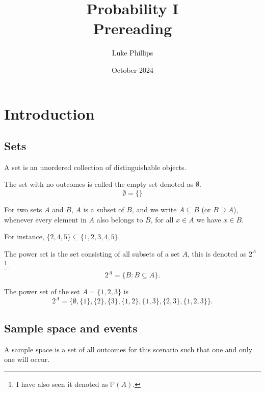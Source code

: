 \documentclass[10pt, a4paper]{article}
\title{Probability I \\
    \large Prereading}
\author{Luke Phillips}
\date{October 2024}
\begin{document}
\maketitle

\newpage

\section{Introduction}

\subsection{Sets}

A set is an unordered collection of distinguishable objects. 

\begin{definition}
    The set with no outcomes is called the empty set denoted as $\emptyset$.
    \[
    \emptyset = \{\}
    \]
\end{definition}

\begin{definition}[Subset]
    For two sets $A$ and $B$, $A$ is a subset of $B$, and we write $A \subseteq B$ (or $B \supseteq A$), whenever every element in $A$ also belongs to $B$, for all $x \in A$ we have $x \in B$.
\end{definition}

\begin{example}
    For instance, $\{2, 4, 5\} \subseteq \{1, 2, 3, 4, 5\}$.    
\end{example}

\begin{definition}
    The power set is the set consisting of all subsets of a set $A$, this is denoted as $2 ^ A$\footnote{I have also seen it denoted as $\mathbb{P}(A)$.}.
    \[
    2 ^ A = \{B: B \subseteq A\}.
    \]
\end{definition}

\begin{example}
    The power set of the set $A = \{1, 2, 3\}$ is
    \[
    2 ^ A = \{\emptyset, \{1\}, \{2\}, \{3\}, \{1, 2\}, \{1, 3\}, \{2, 3\}, \{1, 2, 3\}\}.
    \]
\end{example}

\subsection{Sample space and events}
A sample space is a set of all outcomes for this scenario such that one and only one will occur.
\end{document}
